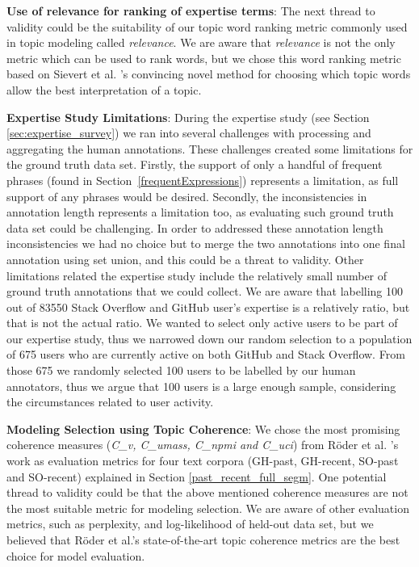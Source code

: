         \textbf{Use of relevance for ranking of expertise terms}: The next thread to validity could be the suitability of our topic word ranking metric commonly used in topic modeling called \emph{relevance}\cite{sievert2014ldavis}. We are aware that \emph{relevance} is not the only metric which can be used to rank words, but we chose this word ranking metric based on Sievert et al. \cite{sievert2014ldavis}'s convincing novel method for choosing which topic words allow the best interpretation of a topic. 
        
        \textbf{Expertise Study Limitations}: During the expertise study (see Section \ref{sec:expertise_survey}) we ran into several challenges with processing and aggregating the human annotations. These challenges created some limitations for the ground truth data set. Firstly, the support of only a handful of frequent phrases (found in Section~\ref{frequentExpressions}) represents a limitation, as full support of any phrases would be desired. Secondly, the inconsistencies in annotation length represents a limitation too, as evaluating such ground truth data set could be challenging. In order to addressed these annotation length inconsistencies we had no choice but to merge the two annotations into one final annotation using set union, and this could be a threat to validity. Other limitations related the expertise study include the relatively small number of ground truth annotations that we could collect. We are aware that labelling 100 out of 83550 Stack Overflow and GitHub user's expertise is a relatively ratio, but that is not the actual ratio. We wanted to select only active users to be part of our expertise study, thus we narrowed down our random selection to a population of 675 users who are currently active on both GitHub and Stack Overflow. From those 675 we randomly selected 100 users to be labelled by our human annotators, thus we argue that 100 users is a large enough sample, considering the circumstances related to user activity.
        
        \textbf{Modeling Selection using Topic Coherence}: We chose the most promising coherence measures (\emph{C\_v, C\_umass, C\_npmi and C\_uci}) from R{\"o}der et al. \cite{roder2015exploring}'s work as evaluation metrics for four text corpora (GH-past, GH-recent, SO-past and SO-recent) explained in Section \ref{past_recent_full_segm}. One potential thread to validity could be that the above mentioned coherence measures are not the most suitable metric for modeling selection. We are aware of other evaluation metrics, such as perplexity, and log-likelihood of held-out data set, but we believed that R{\"o}der et al.'s state-of-the-art topic coherence metrics are the best choice for model evaluation.
        
